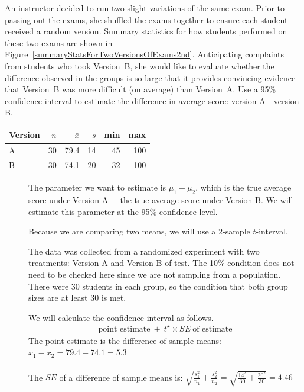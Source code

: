 \begin{examplewrap}
\begin{nexample}
{
An instructor decided to run two slight variations of the same exam. Prior to passing out the exams, she shuffled the exams together to ensure each student received a random version. Summary statistics for how students performed on these two exams are shown in Figure~\ref{summaryStatsForTwoVersionsOfExams2nd}. Anticipating complaints from students who took Version~B, she would like to evaluate whether the difference observed in the groups is so large that it provides convincing evidence that Version~B was more difficult (on average) than Version~A.  Use a 95\% confidence interval to estimate the difference in average score: version A - version B.

\begin{center}
\begin{tabular}{l rrrrr}
\hline
Version\hspace{2mm}	& $n$	& $\bar{x}$	& $s$	& min	& max  \\
\hline
A		& 30		& 79.4		& 14 	& 45		& 100 \\
B		& 30		& 74.1		& 20		& 32		& 100 \\
\hline
\end{tabular}
\end{center}
\label{summaryStatsForTwoVersionsOfExams2nd}

}
\begin{description}
\item[] The parameter we want to estimate is $\mu_{1}-\mu_2$, which is the true average score under Version A $-$ the true average score under Version B.  We will estimate this parameter at the 95\% confidence level.

\item[] Because we are comparing two means, we will use a 2-sample $t$-interval.

\item[] The data was collected from a randomized experiment with two treatments:  Version A and Version B of test.   The 10\% condition does not need to be checked here since we are not sampling from a population.  There were 30 students in each group, so the condition that both group sizes are at least 30 is met.   
\item[]  We will calculate the confidence interval as follows.
\begin{align*}
\text{point estimate}\ \pm\ t^{\star} \times SE\ \text{of estimate}
\end{align*}
The point estimate is the difference of sample means: $\bar{x}_1-\bar{x}_2 = 79.4 - 74.1 = 5.3$\\
\\
The $SE$ of a difference of sample means is:  $\sqrt{\frac{s_1^2}{n_1} + \frac{s_2^2}{n_2}} = \sqrt{\frac{14^2}{30} + \frac{20^2}{30}} = 4.46$ \\


\end{description}
\end{nexample}
\end{examplewrap}
